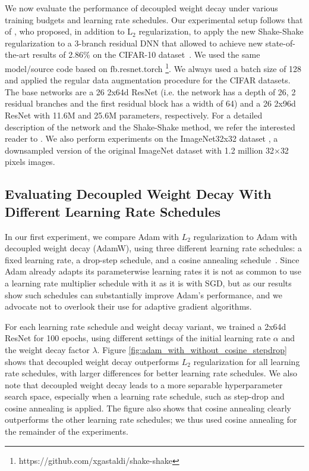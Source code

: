 \documentclass[usenames,dvipsnames]{article}
\begin{document}
We now evaluate the performance of decoupled weight decay under various training budgets and learning rate schedules.
Our experimental setup follows that of \citet{gastaldi2017shake}, who proposed, in addition to L$_2$ regularization, to apply the new Shake-Shake regularization to a 3-branch residual DNN that allowed 
to achieve new state-of-the-art results of 2.86\% on the CIFAR-10 dataset~\citep{krizhevsky2009learning}.
We used the same model/source code based on fb.resnet.torch \footnote{https://github.com/xgastaldi/shake-shake}. 
We always used a batch size of 128 and applied 
the regular data augmentation procedure for the CIFAR datasets. 
The base networks are a 26 2x64d ResNet (i.e. the network has a depth of 26, 2 residual branches and the first residual block has a width of 64) and a 26 2x96d ResNet with 11.6M and 25.6M parameters, respectively. 
For a detailed description of the network and the Shake-Shake method, we refer the interested reader to \citet{gastaldi2017shake}. We also perform experiments on the ImageNet32x32 dataset \citep{chrabaszcz2017downsampled}, a downsampled version of the original ImageNet dataset with 1.2 million  32$\times$32 pixels images. 

\subsection{Evaluating Decoupled Weight Decay With Different Learning Rate Schedules}

In our first experiment, we compare Adam with $L_2$ regularization to Adam with decoupled weight decay (AdamW), using three different learning rate schedules: a fixed learning rate, a drop-step schedule, and a cosine annealing schedule~\citep{loshchilov2016sgdr}.
Since Adam already adapts its parameterwise learning rates it is not as common to use a learning rate multiplier schedule with it as it is with SGD, but as our results show such schedules can substantially improve Adam's performance, and we advocate not to overlook their use for adaptive gradient algorithms. 

For each learning rate schedule and weight decay variant, we trained a 2x64d ResNet for 100 epochs, using different settings of the initial learning rate $\alpha$ and the weight decay factor $\lambda$. 
Figure \ref{fig:adam_with_without_cosine_stepdrop} shows that decoupled weight decay outperforms $L_2$ regularization for all 
learning rate schedules, with larger differences for better learning rate schedules. We also note that decoupled weight decay leads to a more separable hyperparameter search space, especially when a learning rate schedule, such as step-drop and cosine annealing is applied.
The figure also shows that cosine annealing clearly outperforms the other learning rate schedules; we thus used cosine annealing for the remainder of the experiments.
\end{document}
